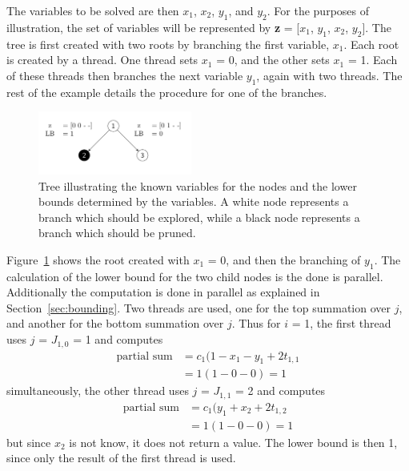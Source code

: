 \documentclass[10pt,twocolumn]{article}
\begin{document}
The variables to be solved are then $x_1$, $x_2$, $y_1$, and $y_2$. For the purposes of illustration, the set
of variables will be represented by \textbf{z} = [$x_1$, $y_1$, $x_2$, $y_2$]. The tree is first created with
two roots by branching the first variable, $x_1$. Each root is created by a thread. One thread sets $x_1$ = 0, 
and the other sets $x_1$ = 1. Each of these threads then branches the next variable $y_1$, again with two
threads. The rest of the example details the procedure for one of the branches.

\begin{figure}[b!]
\centering
\includegraphics[width=0.45\textwidth]{tree1}
\caption{Tree illustrating the known variables for the nodes and the lower bounds determined by the
variables. A white node represents a branch which should be explored, while a black node represents a
branch which should be pruned.}
\label{fig:tree1}
\end{figure}

Figure~\ref{fig:tree1} shows the root created with $x_1$ = 0, and then the branching of $y_1$. The calculation
of the lower bound for the two child nodes is the done is parallel. Additionally the computation is done in
parallel as explained in Section~\ref{sec:bounding}. Two threads are used, one for the top summation over $j$,
and another for the bottom summation over $j$. Thus for $i$ = 1, the first thread uses $j$ = $J_{1,0}$ = 1 and
computes
\begin{align*}
    \textrm{partial sum} &= c_1(1 - x_1 - y_1 + 2t_{1,1} \\
                         &= 1(1 - 0 - 0) = 1
\end{align*}
simultaneously, the other thread uses $j$ = $J_{1,1}$ = 2 and computes
\begin{align*}
    \textrm{partial sum} &= c_1(y_1 + x_2 + 2t_{1,2} \\
                         &= 1(1 - 0 - 0) = 1
\end{align*}
but since $x_2$ is not know, it does not return a value. The lower bound is then 1, since only the result of
the first thread is used.
\end{document}
